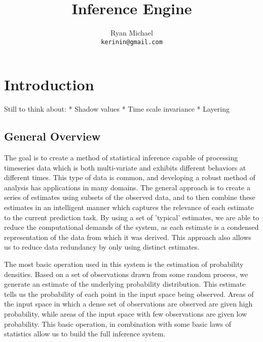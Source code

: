 \documentclass[11pt,twocolumn,titlepage]{article}
\begin{document}
\title{Inference Engine}
\author{Ryan Michael\\ \texttt{kerinin@gmail.com}}
\maketitle


\section{Introduction}
Still to think about:
* Shadow values
* Time scale invariance
* Layering


\subsection{General Overview}
The goal is to create a method of statistical inference capable of processing timeseries data which is both multi-variate and exhibits different behaviors at different times.  This type of data is common, and developing a robust method of analysis has applications in many domains.  The general approach is to create a series of estimates using subsets of the observed data, and to then combine these estimates in an intelligent manner which captures the relevance of each estimate to the current prediction task.  By using a set of 'typical' estimates, we are able to reduce the computational demands of the system, as each estimate is a condensed representation of the data from which it was derived.  This approach also allows us to reduce data redundancy by only using distinct estimates.

The most basic operation used in this system is the estimation of probability densities.  Based on a set of observations drawn from some random process, we generate an estimate of the underlying probability distribution.  This estimate tells us the probability of each point in the input space being observed.  Areas of the input space in which a dense set of observations are observed are given high probability, while areas of the input space with few observations are given low probability.  This basic operation, in combination with some basic laws of statistics allow us to build the full inference system.
\end{document}
